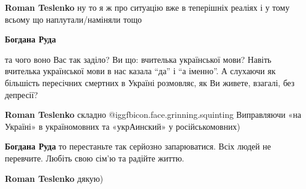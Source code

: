 \begin{itemize}
\begin{itemize}
\textbf{Roman Teslenko} ну то я ж про ситуацію вже в теперішніх реаліях і у тому всьому що наплутали/наміняли тощо

\textbf{Богдана Руда} 

та чого воно Вас так заділо? Ви що: вчителька української мови? Навіть
вчителька української мови в нас казала \enquote{да} і \enquote{а іменно}. А слухаючи як
більшість пересічних смертних в Україні розмовляє, як Ви живете, взагалі, без
депресії?

\textbf{Roman Teslenko} складно @igg{fbicon.face.grinning.squinting} 
Виправляючи «на Україні» в україномовних та «укрАинский» у російськомовних)

\textbf{Богдана Руда} то перестаньте так серйозно запарюватися. Всіх людей не перевчите. Любіть свою сім'ю та радійте життю.


\textbf{Roman Teslenko} дякую)
\end{itemize} %

\end{itemize} %
